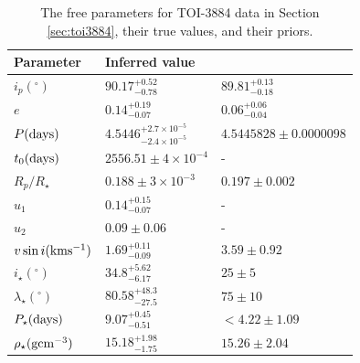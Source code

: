 \documentclass[twocolumn]{aastex631}
\begin{document}
\begin{table}[]
    \vspace{0.5cm}
    \centering
    \caption{The free parameters for TOI-3884 data in Section \ref{sec:toi3884}, their true values, and their priors.}
    \begin{tabular}{lll}
    \hline
    Parameter                                 & Inferred value    & \cite{Libby-Roberts2023} \\ \hline\hline
    $i_p (^\circ)$                            & $90.17^{+0.52}_{-0.78}$                            & $89.81^{+0.13}_{-0.18}$                    \\
    $e$                                       & $0.14^{+0.19}_{-0.07}$                             & $0.06^{+0.06}_{-0.04}$                     \\
    $P (\rm days)$                            & $4.5446^{+2.7\times10^{-5}}_{-2.4\times10^{-5}}$                                                                                              & $4.5445828\pm 0.0000098$                   \\
    $t_0 (\rm days)$                          & $2556.51\pm 4\times 10^{-4}$                       &    -                 \\
    $R_p / R_\star$                           & $0.188 \pm 3\times10^{-3}$                         &  $0.197\pm 0.002$                   \\ 
    $u_1$                                     & $0.14^{+0.15}_{-0.07}$                             &  -                   \\ 
    $u_2$                                     & $0.09 \pm 0.06$                                    &  -                   \\ 
    $v\sin i (\rm kms^{-1})$                  & $1.69^{+0.11}_{-0.09}$                             & $3.59\pm 0.92$                    \\ \hline
    $i_\star (^\circ)$                        & $34.8^{+5.62}_{-6.17}$                             &  $25\pm 5$                    \\
    $\lambda_\star (^\circ)$                  & $80.58^{+48.3}_{-27.5}$                            &  $75\pm 10$                   \\
    $P_\star (\rm days)$                      & $9.07^{+0.45}_{-0.51}$                             & $<4.22\pm 1.09$                    \\ 
    $\rho_\star (\rm gcm^{-3})$               & $15.18^{+1.98}_{-1.75}$                            & $15.26\pm 2.04$                    \\ \hline

\end{tabular}
\end{table}
\end{document}
